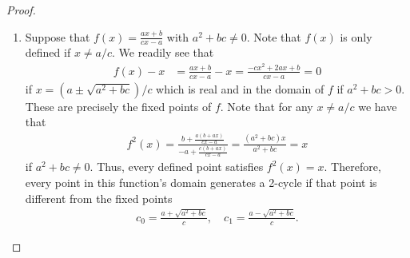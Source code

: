 \begin{proof}
\begin{enumerate}
    \item Suppose that $f(x) = \frac{ax + b}{cx-a}$ with $a^2 + bc \neq 0$.
      Note that $f(x)$ is only defined if $x\neq a/c$. We readily see that
      \begin{align*}
        f(x) - x &= \frac{ax + b}{cx-a} - x = \frac{-cx^2 + 2ax + b}{cx-a} = 0
      \end{align*}
      if $x = \left(a \pm \sqrt{a^2 + b c}\right)/c$ which is real and in the domain of $f$
      if $a^2 + bc > 0$. These are precisely the
      fixed points of $f$.
      Note that for any $x\neq a/c$ we have that
      \begin{align*}
        f^2(x) = \frac{ b + \frac{ a(b + ax)}{ cx - a } }{ -a + \frac{ c(b + ax)}{ cx - a} } = \frac{(a^2 + bc)x}{a^2 + bc} = x
      \end{align*}
      if $a^2 + bc \neq 0$. Thus, every defined point satisfies $f^2(x) = x$. Therefore,
      every point in this function's domain generates a 2-cycle if that point
      is different from the fixed points
      \begin{align*}
        c_0 = \frac{a + \sqrt{a^2 + b c}}{c}, \quad c_1 = \frac{a - \sqrt{a^2 + b c}}{c}.
      \end{align*}
  \end{enumerate}
\end{proof}
\newpage
